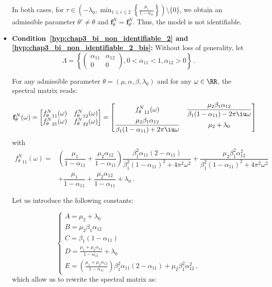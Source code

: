 \begin{subappendices}
\begin{itemize}
In both cases, for $\tau \in\left(-\lambda_0, \min_{1\leq i \leq 2}\left\{\frac{\mu_i}{1-\alpha_{ii}}\right\} \right)\setminus\{0\}$, we obtain an admissible parameter $\theta' \neq \theta$ and
$\mathbf{f}_\theta^N = \mathbf{f}_{\theta'}^N$.
Thus, the model is not identifiable.






\item \textbf{Condition~\ref{hyp:chap3_bi_non_identifiable_2} and \ref{hyp:chap3_bi_non_identifiable_2_bis}:} 
Without loss of generality, let 
\[\Lambda = \left\{ \begin{pmatrix} \alpha_{11} & \alpha_{12} \\ 0 & 0 \end{pmatrix}, 0 < \alpha_{11} < 1, \alpha_{12} > 0 \right\}\,.\] 

For any admissible parameter $\theta = (\mu, \alpha, \beta, \lambda_0)$ and for any $\omega\in\RR$, the spectral matrix reads: 

\begin{equation*}
\mathbf{f}_\theta^N(\omega) = 
\begin{bmatrix}
  {f_\theta^N}_{11}(\omega) & {f_\theta^N}_{12}(\omega)\\
  {f_\theta^N}_{21}(\omega) & {f_\theta^N}_{22}(\omega)
\end{bmatrix}	=
\begin{bmatrix}
  {f_\theta^N}_{11}(\omega) &  \dfrac{\mu_2 \beta_1 \alpha_{12}}{\beta_1(1-\alpha_{11}) - 2 \pi \iu \omega}\\
   \dfrac{\mu_2 \beta_1 \alpha_{12}}{\beta_1(1-\alpha_{11}) + 2 \pi \iu \omega} & \mu_2 + \lambda_0
\end{bmatrix}
\end{equation*}
with 
\begin{align*}
{f_\theta^N}_{11}(\omega) = &\left(\dfrac{\mu_1}{1-\alpha_{11}} + \dfrac{\mu_2\alpha_{12}}{1-\alpha_{11}} \right)\dfrac{\beta_1^2 \alpha_{11}(2-\alpha_{11})}{\beta_1^2 (1-\alpha_{11})^2 + 4 \pi^2\omega^2} + \dfrac{\mu_2 \beta_1^2 \alpha_{12}^2}{\beta_1^2 (1-\alpha_{11})^2 + 4 \pi^2\omega^2} \\
&+ \dfrac{\mu_1}{1-\alpha_{11}} + \dfrac{\mu_2\alpha_{12}}{1-\alpha_{11}} + \lambda_0\,.
\end{align*}

Let us introduce the following constants:

\begin{equation*}
\begin{cases}
  A = \mu_2 + \lambda_0\\
  B = \mu_2 \beta_1 \alpha_{12}\\
  C = \beta_1 (1-\alpha_{11})\\
  D = \frac{\mu_1 + \mu_2 \alpha_{12}}{1-\alpha_{11}} + \lambda_0\\
  E = (\frac{\mu_1 + \mu_2 \alpha_{12}}{1-\alpha_{11}} ) \beta_1^2 \alpha_{11} (2-\alpha_{11}) + \mu_2 \beta_1^2 \alpha_{12}^2\,,
\end{cases}
\end{equation*}
which allow us to rewrite the spectral matrix as:


\end{itemize}
\end{subappendices}
